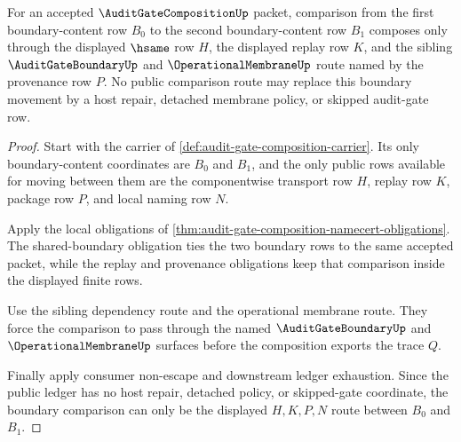 \begin{theorem}
\label{thm:audit-gate-composition-shared-boundary-transitivity}
For an accepted $\AuditGateCompositionUp$ packet, comparison from the first
boundary-content row $B_0$ to the second boundary-content row $B_1$ composes
only through the displayed $\hsame$ row $H$, the displayed replay row $K$, and
the sibling $\AuditGateBoundaryUp$ and $\OperationalMembraneUp$ route named by
the provenance row $P$. No public comparison route may replace this boundary
movement by a host repair, detached membrane policy, or skipped audit-gate row.
\end{theorem}
\begin{proof}
Start with the carrier of
\autoref{def:audit-gate-composition-carrier}. Its only boundary-content
coordinates are $B_0$ and $B_1$, and the only public rows available for moving
between them are the componentwise transport row $H$, replay row $K$, package
row $P$, and local naming row $N$.

Apply the local obligations of
\autoref{thm:audit-gate-composition-namecert-obligations}. The shared-boundary
obligation ties the two boundary rows to the same accepted packet, while the
replay and provenance obligations keep that comparison inside the displayed
finite rows.

Use the sibling dependency route and the operational membrane route. They force
the comparison to pass through the named $\AuditGateBoundaryUp$ and
$\OperationalMembraneUp$ surfaces before the composition exports the trace
$Q$.

Finally apply consumer non-escape and downstream ledger exhaustion. Since the
public ledger has no host repair, detached policy, or skipped-gate coordinate,
the boundary comparison can only be the displayed $H,K,P,N$ route between
$B_0$ and $B_1$.
\end{proof}

